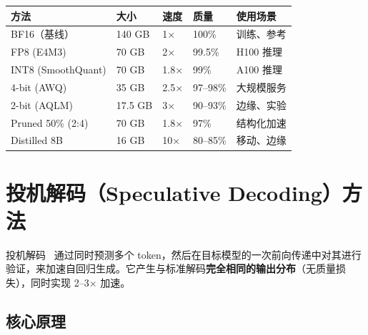 \begin{examplebox}[压缩方法对比 —— 70B 模型]
\noindent\begin{tabularx}{\linewidth}{@{}l Z{0.92} Z{0.92} Z{0.95} Z{1.21}@{}}
\toprule
\textbf{方法} & \textbf{大小} & \textbf{速度} & \textbf{质量} & \textbf{使用场景} \\
\midrule
BF16（基线） & 140 GB & 1$\times$ & 100\% & 训练、参考 \\
FP8 (E4M3) & 70 GB & 2$\times$ & 99.5\% & H100 推理 \\
INT8 (SmoothQuant) & 70 GB & 1.8$\times$ & 99\% & A100 推理 \\
4-bit (AWQ) & 35 GB & 2.5$\times$ & 97--98\% & 大规模服务 \\
2-bit (AQLM) & 17.5 GB & 3$\times$ & 90--93\% & 边缘、实验 \\
Pruned 50\% (2:4) & 70 GB & 1.8$\times$ & 97\% & 结构化加速 \\
Distilled 8B & 16 GB & 10$\times$ & 80--85\% & 移动、边缘 \\
\bottomrule
\end{tabularx}
\end{examplebox}

\section{投机解码（Speculative Decoding）方法}
\label{speculative-decoding-methods}

投机解码~\cite{leviathan2023fast} 通过同时预测多个 token，然后在目标模型的一次前向传递中对其进行验证，来加速自回归生成。它产生与标准解码\textbf{完全相同的输出分布}（无质量损失），同时实现 2--3$\times$ 加速。

\subsection{核心原理}
\label{core-principle}

